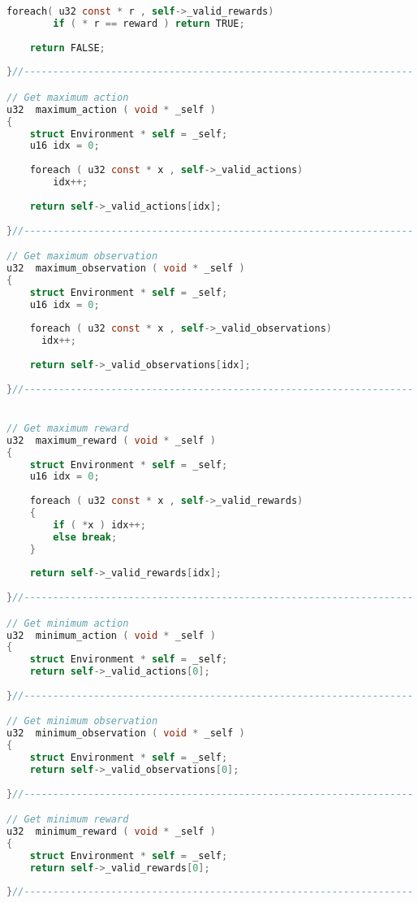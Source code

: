\documentclass[fancychapters]{report}   	%
\begin{document}
\begin{lstlisting}[language=C,caption={environment.c}]
    foreach( u32 const * r , self->_valid_rewards)
        if ( * r == reward ) return TRUE;
    
    return FALSE;
    
}//-------------------------------------------------------------------

// Get maximum action
u32  maximum_action ( void * _self )
{
    struct Environment * self = _self;
    u16 idx = 0;
    
    foreach ( u32 const * x , self->_valid_actions)
        idx++;
    
    return self->_valid_actions[idx];
    
}//-------------------------------------------------------------------

// Get maximum observation
u32  maximum_observation ( void * _self )
{
    struct Environment * self = _self;
    u16 idx = 0;
    
    foreach ( u32 const * x , self->_valid_observations)
      idx++;
    
    return self->_valid_observations[idx];
    
}//-------------------------------------------------------------------


// Get maximum reward
u32  maximum_reward ( void * _self )
{
    struct Environment * self = _self;
    u16 idx = 0;
    
    foreach ( u32 const * x , self->_valid_rewards)
    { 
        if ( *x ) idx++;
        else break;
    }
    
    return self->_valid_rewards[idx];
    
}//-------------------------------------------------------------------

// Get minimum action
u32  minimum_action ( void * _self )
{
    struct Environment * self = _self;
    return self->_valid_actions[0];
    
}//-------------------------------------------------------------------

// Get minimum observation
u32  minimum_observation ( void * _self )
{
    struct Environment * self = _self;
    return self->_valid_observations[0];
    
}//-------------------------------------------------------------------

// Get minimum reward
u32  minimum_reward ( void * _self )
{
    struct Environment * self = _self;
    return self->_valid_rewards[0];
    
}//-------------------------------------------------------------------


\end{lstlisting}
\end{document}
